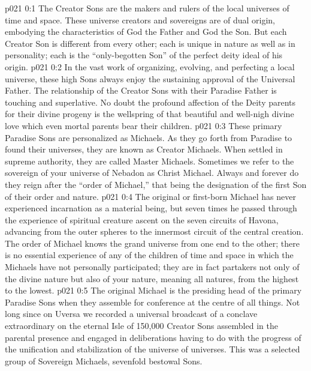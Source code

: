 \author{Perfector of Wisdom}
\vs p021 0:1 The Creator Sons are the makers and rulers of the local universes of time and space. These universe creators and sovereigns are of dual origin, embodying the characteristics of God the Father and God the Son. But each Creator Son is different from every other; each is unique in nature as well as in personality; each is the “only\hyp{}begotten Son” of the perfect deity ideal of his origin.
\vs p021 0:2 In the vast work of organizing, evolving, and perfecting a local universe, these high Sons always enjoy the sustaining approval of the Universal Father. The relationship of the Creator Sons with their Paradise Father is touching and superlative. No doubt the profound affection of the Deity parents for their divine progeny is the wellspring of that beautiful and well\hyp{}nigh divine love which even mortal parents bear their children.
\vs p021 0:3 These primary Paradise Sons are personalized as Michaels. As they go forth from Paradise to found their universes, they are known as Creator Michaels. When settled in supreme authority, they are called Master Michaels. Sometimes we refer to the sovereign of your universe of Nebadon as Christ Michael. Always and forever do they reign after the “order of Michael,” that being the designation of the first Son of their order and nature.
\vs p021 0:4 \pc The original or first\hyp{}born Michael has never experienced incarnation as a material being, but seven times he passed through the experience of spiritual creature ascent on the seven circuits of Havona, advancing from the outer spheres to the innermost circuit of the central creation. The order of Michael knows the grand universe from one end to the other; there is no essential experience of any of the children of time and space in which the Michaels have not personally participated; they are in fact partakers not only of the divine nature but also of your nature, meaning all natures, from the highest to the lowest.
\vs p021 0:5 The original Michael is the presiding head of the primary Paradise Sons when they assemble for conference at the centre of all things. Not long since on Uversa we recorded a universal broadcast of a conclave extraordinary on the eternal Isle of 150,000 Creator Sons assembled in the parental presence and engaged in deliberations having to do with the progress of the unification and stabilization of the universe of universes. This was a selected group of Sovereign Michaels, sevenfold bestowal Sons.
